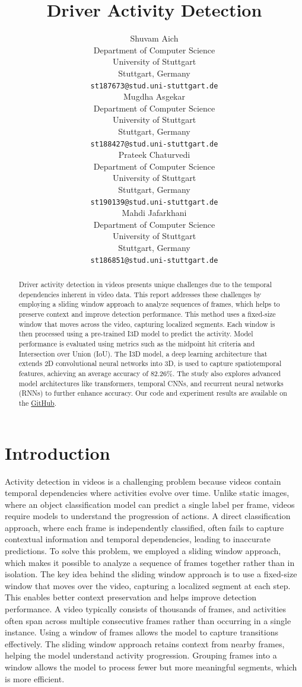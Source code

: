 \documentclass{article}
\title{Driver Activity Detection}
\author{%
  Shuvam Aich \\
  Department of Computer Science\\
  University of Stuttgart\\
  Stuttgart, Germany \\
  \texttt{st187673@stud.uni-stuttgart.de} \\
  \And
  Mugdha Asgekar \\
  Department of Computer Science\\
  University of Stuttgart\\
  Stuttgart, Germany \\
  \texttt{st188427@stud.uni-stuttgart.de} \\
  \AND
  Prateek Chaturvedi \\
  Department of Computer Science\\
  University of Stuttgart\\
  Stuttgart, Germany \\
  \texttt{st190139@stud.uni-stuttgart.de} \\
  \And
  Mahdi Jafarkhani \\
  Department of Computer Science\\
  University of Stuttgart\\
  Stuttgart, Germany \\
  \texttt{st186851@stud.uni-stuttgart.de} \\
}
\begin{document}
\maketitle


\begin{abstract}
Driver activity detection in videos presents unique challenges due to the temporal dependencies inherent in video data. This report addresses these challenges by employing a sliding window approach to analyze sequences of frames, which helps to preserve context and improve detection performance. This method uses a fixed-size window that moves across the video, capturing localized segments. Each window is then processed using a pre-trained I3D model to predict the activity. Model performance is evaluated using metrics such as the midpoint hit criteria and Intersection over Union (IoU). The I3D model, a deep learning architecture that extends 2D convolutional neural networks into 3D, is used to capture spatiotemporal features, achieving an average accuracy of 82.26\%. The study also explores advanced model architectures like transformers, temporal CNNs, and recurrent neural networks (RNNs) to further enhance accuracy. Our code and experiment results are available on
the \href{https://github.com/M-Jafarkhani/DriveAndActInferenceDemo}{GitHub}.
\end{abstract}


\section{Introduction}

Activity detection in videos is a challenging problem because videos contain temporal dependencies where activities evolve over time. Unlike static images, where an object classification model can predict a single label per frame, videos require models to understand the progression of actions. A direct classification approach, where each frame is independently classified, often fails to capture contextual information and temporal dependencies, leading to inaccurate predictions. To solve this problem, we employed a sliding window approach, which makes it possible to analyze a sequence of frames together rather than in isolation. The key idea behind the sliding window approach is to use a fixed-size window that moves over the video, capturing a localized segment at each step. This enables better context preservation and helps improve detection performance. A video typically consists of thousands of frames, and activities often span across multiple consecutive frames rather than occurring in a single instance. Using a window of frames allows the model to capture transitions effectively. The sliding window approach retains context from nearby frames, helping the model understand activity progression. Grouping frames into a window allows the model to process fewer but more meaningful segments, which is more efficient.
\end{document}
